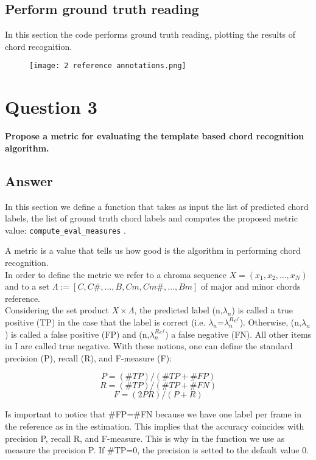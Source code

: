 \documentclass{article}
\begin{document}
\subsection*{Perform ground truth reading}
In this section the code performs ground truth reading, plotting the results of chord recognition.

\begin{figure}[H]
 \centering
 \texttt{[image: 2 reference annotations.png]}
\end{figure}


\section*{\color{red}Question 3}

\begin{problem}
	\textbf{Propose a metric for evaluating the template based chord recognition algorithm.}
\end{problem}

\subsection*{\color{blue}Answer}

In this section we define a function that takes as input the list of predicted chord labels, the list of ground truth chord labels and computes the proposed metric value: \verb |compute_eval_measures| .

A metric is a value that tells us how good is the algorithm in performing chord recognition.\\
In order to define the metric we refer to a chroma sequence \(X=(x_1,x_2,…,x_N)\) and to a set \( \Lambda :=[C,C\#,…,B,Cm,Cm\#,…,Bm] \) of major and minor chords reference.\\
Considering the set product $X \times \Lambda$, the predicted label (n,$\lambda_n$) is called a true positive (TP) in the case that the label is correct (i.e. $\lambda_n$=$\lambda_n^R^e^f$). Otherwise, (n,$\lambda_n$) is called a false positive (FP) and (n,$\lambda_n^R^e^f$) a false negative (FN). All other items in I are called true negative. With these notions, one can define the standard precision (P), recall (R), and F-measure (F):

\[P=(\#TP)/(\#TP + \#FP)\]
\[R=(\#TP)/(\#TP + \#FN)\]
\[F=(2PR)/(P + R)\]

Is important to notice that \#FP=\#FN because we have one label per frame in the reference as in the estimation. This implies that the accuracy coincides with precision P, recall R, and F-measure. This is why in the function we use as measure the precision P. If \#TP=0, the precision is setted to the default value 0.
\end{document}
